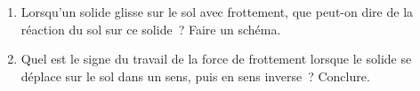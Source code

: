 \begin{enumerate}
    \item Lorsqu'un solide glisse sur le sol avec frottement, que peut-on dire
          de la réaction du sol sur ce solide~? Faire un schéma.
    \item Quel est le signe du travail de la force de frottement lorsque le
          solide se déplace sur le sol dans un sens, puis en sens inverse~?
          Conclure.
\end{enumerate}

